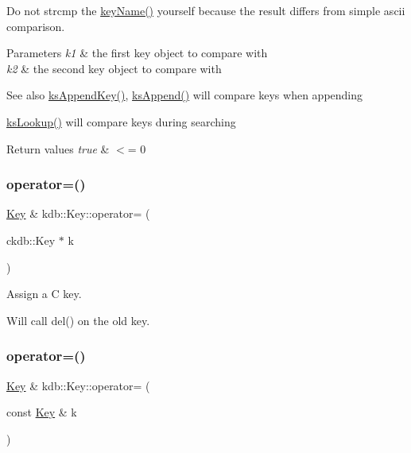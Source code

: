 Do not strcmp the \hyperlink{group__keyname_ga8e805c726a60da921d3736cda7813513}{key\+Name()} yourself because the result differs from simple ascii comparison.


\begin{DoxyParams}{Parameters}
{\em k1} & the first key object to compare with \\
\hline
{\em k2} & the second key object to compare with\\
\hline
\end{DoxyParams}
\begin{DoxySeeAlso}{See also}
\hyperlink{group__keyset_gaa5a1d467a4d71041edce68ea7748ce45}{ks\+Append\+Key()}, \hyperlink{group__keyset_ga21eb9c3a14a604ee3a8bdc779232e7b7}{ks\+Append()} will compare keys when appending 

\hyperlink{group__keyset_gaa34fc43a081e6b01e4120daa6c112004}{ks\+Lookup()} will compare keys during searching
\end{DoxySeeAlso}

\begin{DoxyRetVals}{Return values}
{\em true} & $<$= 0 \\
\hline
\end{DoxyRetVals}
\mbox{\label{classkdb_1_1Key_a628f3ee543a1d71d4488233018eddd86}} 
\subsubsection{\texorpdfstring{operator=()}{operator=()}\hspace{0.1cm}{\footnotesize\ttfamily [1/2]}}
{\footnotesize\ttfamily \hyperlink{classkdb_1_1Key}{Key} \& kdb\+::\+Key\+::operator= (\begin{DoxyParamCaption}\item[{ckdb\+::\+Key $\ast$}]{k }\end{DoxyParamCaption})\hspace{0.3cm}{\ttfamily [inline]}}



Assign a C key. 

Will call del() on the old key. \mbox{\label{classkdb_1_1Key_a63a006c140cfd2a633c6fdf3f9eb9d1a}} 
\subsubsection{\texorpdfstring{operator=()}{operator=()}\hspace{0.1cm}{\footnotesize\ttfamily [2/2]}}
{\footnotesize\ttfamily \hyperlink{classkdb_1_1Key}{Key} \& kdb\+::\+Key\+::operator= (\begin{DoxyParamCaption}\item[{const \hyperlink{classkdb_1_1Key}{Key} \&}]{k }\end{DoxyParamCaption})\hspace{0.3cm}{\ttfamily [inline]}}



